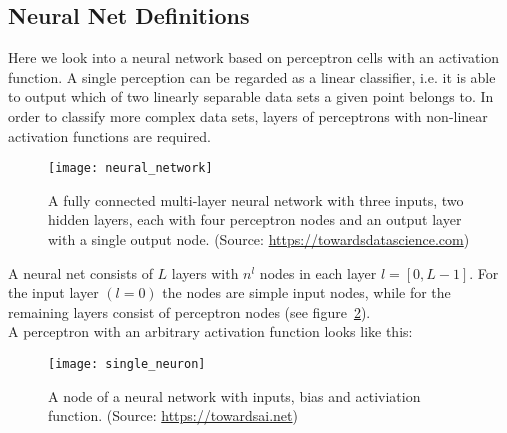 \subsection{Neural Net Definitions}

Here we look into a neural network based on perceptron cells with an activation function.
A single perception can be regarded as a linear classifier, i.e. it is able to output
which of two linearly separable data sets a given point belongs to. In order to classify
more complex data sets, layers of perceptrons with non-linear activation functions are
required.

\begin{figure}[h] \centering \texttt{[image: neural\_network]}
    \caption{A fully connected multi-layer neural network with three inputs, two hidden
    layers, each with four perceptron nodes and an output layer with a single output node.
    (Source: \url{https://towardsdatascience.com})} \label{fig:neural_network}
\end{figure}

A neural net consists of $L$ layers with $n^l$ nodes in each layer $l=[0,L-1]$. For the
input layer $(l=0)$ the nodes are simple input nodes, while for the remaining layers
consist of perceptron nodes (see figure~\ref{fig:perceptron}). \\

A perceptron with an arbitrary activation function looks like this:
\begin{figure}[h] \centering \texttt{[image: single\_neuron]}
    \caption{A node of a neural network with inputs, bias and activiation function.
    (Source: \url{https://towardsai.net})}
    \label{fig:perceptron}
\end{figure}

